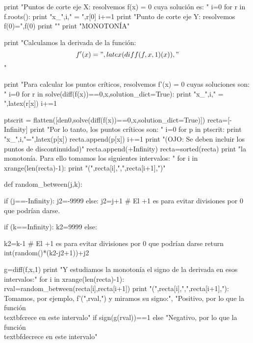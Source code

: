 \begin{sagesilent}
print "Puntos de corte eje X: resolvemos f(x) = 0 cuya solución es: "
i=0
for r in f.roots():
    print "x_",i," = ",r[0]
    i+=1
print "Punto de corte eje Y: resolvemos f(0)=",f(0)
print "\n\n"
print "MONOTONÍA"

print "Calculamos la derivada de la función: \[f'(x) = ",latex(diff(f,x,1)(x)),"\]"

print "Para calcular los puntos críticos, resolvemos f'(x) = 0 cuyas soluciones son: "
i=0
for r in solve(diff(f(x))==0,x,solution_dict=True):
    print "x_",i," = ",latex(r[x])
    i+=1
   
ptscrit = flatten([den0,solve(diff(f(x))==0,x,solution_dict=True)])
recta=[-Infinity]
print "\n Por lo tanto, los puntos críticos son: "
i=0
for p in ptscrit:
    print "x_",i,"=",latex(p[x])
    recta.append(p[x])
    i+=1
print "(OJO: Se deben incluir los puntos de discontinuidad)"
recta.append(+Infinity)
recta=sorted(recta)
print "\n\nEstudiamos la monotonía. Para ello tomamos los siguientes intervalos: "
for i in xrange(len(recta)-1):
    print "(",recta[i],",",recta[i+1],")"

def random_between(j,k):
    
    if (j==-Infinity):
        j2=-9999
    else:
        j2=j+1 # El +1 es para evitar divisiones por 0 que podrían darse.
        
    if (k==Infinity):
        k2=9999
    else:        
        
        k2=k-1 # El +1 es para evitar divisiones por 0 que podrían darse
    return int(random()*(k2-j2+1))+j2

   
g=diff(f,x,1)
print "Y estudiamos la monotonía el signo de la derivada en esos intervalos:"
for i in xrange(len(recta)-1):
    rval=random_between(recta[i],recta[i+1])
    print "(",recta[i],",",recta[i+1],"): Tomamos, por ejemplo, f'(",rval,") y miramos su signo:", "Positivo, por lo que la función \\textbf{crece} en este intervalo" if sign(g(rval))==1 else "Negativo, por lo que la función \\textbf{decrece} en este intervalo"
\end{sagesilent}
